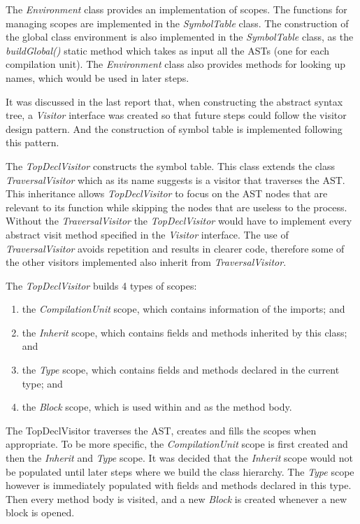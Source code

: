 \documentclass[a4paper, notitlepage]{report}
\begin{document}
The \emph{Environment} class provides an implementation of scopes. The functions for managing scopes are implemented in the \emph{SymbolTable} class. The construction of the global class environment is also implemented in the \emph{SymbolTable} class, as the \emph{buildGlobal()} static method which takes as input all the ASTs (one for each compilation unit). The \emph{Environment} class also provides methods for looking up names, which would be used in later steps.

It was discussed in the last report that, when constructing the abstract syntax tree, a \emph{Visitor} interface was created so that future steps could follow the visitor design pattern. And the construction of symbol table is implemented following this pattern.

The \emph{TopDeclVisitor} constructs the symbol table. This class extends the class \emph{TraversalVisitor} which as its name suggests is a visitor that traverses the AST. This inheritance allows \emph{TopDeclVisitor} to focus on the AST nodes that are relevant to its function while skipping the nodes that are useless to the process. Without the \emph{TraversalVisitor} the \emph{TopDeclVisitor} would have to implement every abstract visit method specified in the \emph{Visitor} interface. The use of \emph{TraversalVisitor} avoids repetition and results in clearer code, therefore some of the other visitors implemented also inherit from \emph{TraversalVisitor}.

The \emph{TopDeclVisitor} builds 4 types of scopes: 
\begin{enumerate}
\item the \emph{CompilationUnit} scope, which contains information of the imports; and
\item the \emph{Inherit} scope, which contains fields and methods inherited by this class; and
\item the \emph{Type} scope, which contains fields and methods declared in the current type; and
\item the \emph{Block} scope, which is used within and as the method body.

\end{enumerate}

The TopDeclVisitor traverses the AST, creates and fills the scopes when appropriate. To be more specific, the \emph{CompilationUnit} scope is first created and then the \emph{Inherit} and \emph{Type} scope. It was decided that the \emph{Inherit} scope would not be populated until later steps where we build the class hierarchy. The \emph{Type} scope however is immediately populated with fields and methods declared in this type. Then every method body is visited, and a new \emph{Block} is created whenever a new block is opened. 
\end{document}
